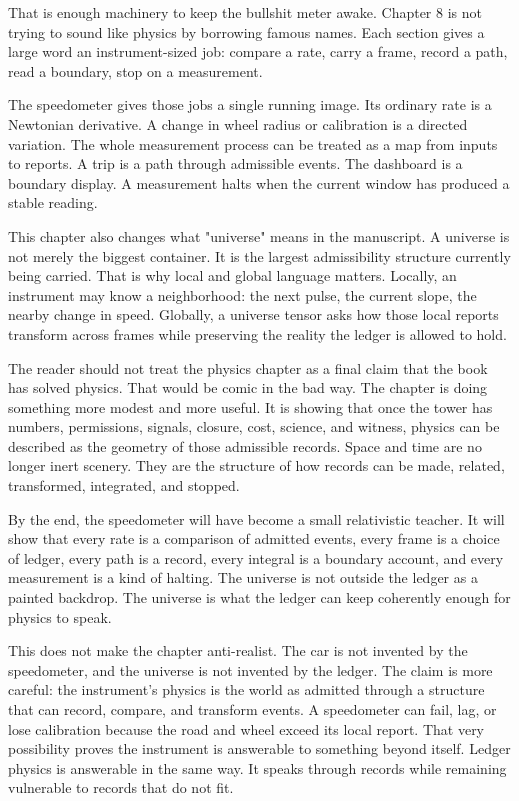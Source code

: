 That is enough machinery to keep the bullshit meter awake. Chapter 8 is not
trying to sound like physics by borrowing famous names. Each section gives a
large word an instrument-sized job: compare a rate, carry a frame, record a
path, read a boundary, stop on a measurement.

The speedometer gives those jobs a single running image. Its ordinary rate is a
Newtonian derivative. A change in wheel radius or calibration is a directed
variation. The whole measurement process can be treated as a map from inputs to
reports. A trip is a path through admissible events. The dashboard is a
boundary display. A measurement halts when the current window has produced a
stable reading.

This chapter also changes what "universe" means in the manuscript. A universe
is not merely the biggest container. It is the largest admissibility structure
currently being carried. That is why local and global language matters. Locally,
an instrument may know a neighborhood: the next pulse, the current slope, the
nearby change in speed. Globally, a universe tensor asks how those local
reports transform across frames while preserving the reality the ledger is
allowed to hold.

The reader should not treat the physics chapter as a final claim that the book
has solved physics. That would be comic in the bad way. The chapter is doing
something more modest and more useful. It is showing that once the tower has
numbers, permissions, signals, closure, cost, science, and witness, physics can
be described as the geometry of those admissible records. Space and time are no
longer inert scenery. They are the structure of how records can be made,
related, transformed, integrated, and stopped.

By the end, the speedometer will have become a small relativistic teacher. It
will show that every rate is a comparison of admitted events, every frame is a
choice of ledger, every path is a record, every integral is a boundary account,
and every measurement is a kind of halting. The universe is not outside the
ledger as a painted backdrop. The universe is what the ledger can keep
coherently enough for physics to speak.

This does not make the chapter anti-realist. The car is not invented by the
speedometer, and the universe is not invented by the ledger. The claim is more
careful: the instrument's physics is the world as admitted through a structure
that can record, compare, and transform events. A speedometer can fail, lag, or
lose calibration because the road and wheel exceed its local report. That very
possibility proves the instrument is answerable to something beyond itself.
Ledger physics is answerable in the same way. It speaks through records while
remaining vulnerable to records that do not fit.

